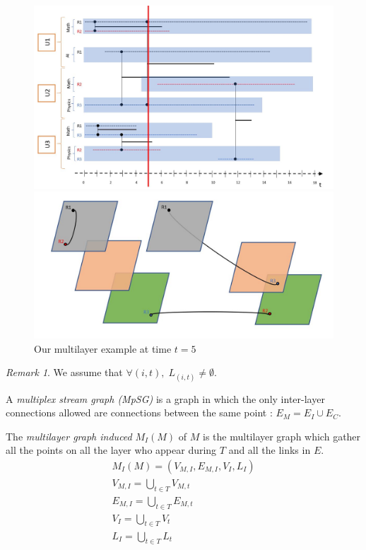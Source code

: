 \documentclass[dvipsnames,a4paper,11pt]{article}
\theoremstyle{definition}
\theoremstyle{remark}
\newtheorem{rmq}{Remark}
\theoremstyle{remark}
\begin{document}
	\begin{figure}[h]
		\begin{minipage}{0.49\linewidth}
			\includegraphics[width=\textwidth]{schemas/pauset.jpg}
		\end{minipage}
		\begin{minipage}{0.49\linewidth}
			\includegraphics[width=\textwidth]{schemas/pausetproj.jpg}
		\end{minipage}
		\caption{Our multilayer example at time $t=5$}
	\end{figure}
	
    \begin{rmq}
    	We assume that $\forall (i,t), \; L_{(i,t)} \neq \emptyset$.
    \end{rmq}

    A {\em multiplex stream graph (MpSG)} is a graph in which the only inter-layer connections allowed are connections between the same point : $E_M = E_I \cup E_C$.

    The {\em multilayer graph induced} $M_I(M)$ of $M$ is the multilayer graph which gather all the points on all the layer who appear during $T$ and all the links in $E$.
    \begin{align*}
    	M_I(M) = (V_{M,I}, E_{M,I}, V_I,L_I)\\
    	V_{M,I} = \bigcup_{t\in T} V_{M,t}\\
    	E_{M,I} = \bigcup_{t\in T} E_{M,t}\\
    	V_I = \bigcup_{t\in T} V_t \\
    	L_I = \bigcup_{t\in T} L_t\\
    \end{align*}
\end{document}
